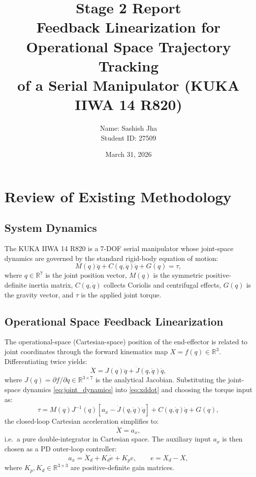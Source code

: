 \documentclass[11pt,a4paper]{article}
\title{\textbf{Stage 2 Report}\\[0.4em]
  \large Feedback Linearization for Operational Space Trajectory Tracking\\
  of a Serial Manipulator (KUKA IIWA 14 R820)}
\author{Name: Sashish Jha\\Student ID: 27509}
\date{March 31, 2026}
\begin{document}
\maketitle
\thispagestyle{empty}

\section{Review of Existing Methodology}

\subsection{System Dynamics}

The KUKA IIWA 14 R820 is a 7-DOF serial manipulator whose joint-space dynamics
are governed by the standard rigid-body equation of motion:
\begin{equation}
  M(q)\ddot{q} + C(q,\dot{q})\dot{q} + G(q) = \tau,
  \label{eq:joint_dynamics}
\end{equation}
where $q \in \mathbb{R}^{7}$ is the joint position vector, $M(q)$ is the
symmetric positive-definite inertia matrix, $C(q,\dot{q})$ collects Coriolis
and centrifugal effects, $G(q)$ is the gravity vector, and $\tau$ is the
applied joint torque.

\subsection{Operational Space Feedback Linearization}

The operational-space (Cartesian-space) position of the end-effector is related
to joint coordinates through the forward kinematics map $X = f(q) \in
\mathbb{R}^{3}$. Differentiating twice yields:
\begin{equation}
  \ddot{X} = J(q)\ddot{q} + \dot{J}(q,\dot{q})\dot{q},
  \label{eq:xddot}
\end{equation}
where $J(q) = \partial f/\partial q \in \mathbb{R}^{3\times 7}$ is the
analytical Jacobian. Substituting the joint-space dynamics \eqref{eq:joint_dynamics}
into \eqref{eq:xddot} and choosing the torque input as:
\begin{equation}
  \tau = M(q)J^{-1}(q)\!\left[a_x - \dot{J}(q,\dot{q})\dot{q}\right]
       + C(q,\dot{q})\dot{q} + G(q),
  \label{eq:fl_law}
\end{equation}
the closed-loop Cartesian acceleration simplifies to:
\begin{equation}
  \ddot{X} = a_x,
  \label{eq:double_integrator}
\end{equation}
i.e.\ a pure double-integrator in Cartesian space. The auxiliary input $a_x$
is then chosen as a PD outer-loop controller:
\begin{equation}
  a_x = \ddot{X}_d + K_d\dot{e} + K_p e, \qquad e = X_d - X,
  \label{eq:pd_outer}
\end{equation}
where $K_p, K_d \in \mathbb{R}^{3\times 3}$ are positive-definite gain matrices.
\end{document}
